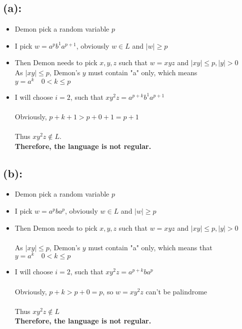 \documentclass [9 pt]{article}
\theoremstyle{definition}
\begin{document}
\subsection*{(a):}
\begin{itemize}
	\item Demon pick a random variable $p$ \\
	
	
	\item I pick $w = a^pb^1a^{p+1}$, obviously $w \in L$ and $ |w| \geq p$\\


	\item Then Demon needs to pick $x, y, z$ such that $w = xyz$ and $|xy| \leq p, |y| > 0$ \\
	\newline
	As $|xy| \leq p$, Demon's $y$ must contain "a" only, which means $y = a^k \quad 0 < k \leq p$ \\
	
	
	
	\item I will choose $i = 2$, such that $xy^2z = a^{p +  k}b^1 a^{p+1} $\\\\
	Obviously, $p + k + 1 > p + 0 + 1 = p + 1$\\\\
	Thus $xy^2z \notin L $.\\
	\newline
	\textbf{ Therefore, the language is not regular. }
\end{itemize}


\subsection*{(b):}
\begin{itemize}
	\item Demon pick a random variable $p$\\
	
	\item I pick $w = a^pba^{p}$, obviously $w \in L$ and $ |w| \geq p$ \\
	
	\item Then Demon needs to pick $x, y, z$ such that $w = xyz$ and $|xy| \leq p, |y| > 0 $ \\\\
	As $|xy| \leq p$, Demon's $y$ must contain "a" only, which means that $ y = a^k \quad 0 <  k \leq p$\\
	\item I will choose $i = 2$, such that $xy^2z = a^{p +  k}b a^{p} $\\\\
	Obviously, $p + k > p + 0 =  p $, so $w = xy^2z $ can't be palindrome\\\\
	Thus $xy^2z \notin L $\\
	\newline
	\textbf{ Therefore, the language is not regular. }
\end{itemize}
\end{document}

